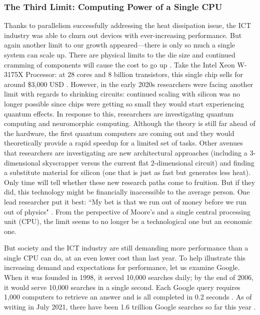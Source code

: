 \documentclass{article}
\begin{document}
\subsubsection{The Third Limit: Computing Power of a Single CPU}
Thanks to parallelism successfully addressing the heat dissipation issue, the ICT industry was able to churn out devices with ever-increasing performance. But again another limit to our growth appeared—there is only so much a single system can scale up. There are physical limits to the die size and continued cramming of components will cause the cost to go up \cite{krzyzanowski2020distributedsystems}. Take the Intel Xeon W-3175X Processor: at 28 cores and 8 billion transistors, this single chip sells for around \$3,000 USD \cite{intel2021processor}. However, in the early 2020s researchers were facing another limit with regards to shrinking circuits: continued scaling with silicon was no longer possible since chips were getting so small they would start experiencing quantum effects. In response to this, researchers are investigating quantum computing and neuromorphic computing. Although the theory is still far ahead of the hardware, the first quantum computers are coming out \cite{newscientist2020IBMquantum, chen2021integrated} and they would theoretically provide a rapid speedup for a limited set of tasks. Other avenues that researchers are investigating are new architectural approaches (including a 3-dimensional skyscrapper versus the current flat 2-dimensional circuit) and finding a substitute material for silicon (one that is just as fast but generates less heat). Only time will tell whether these new research paths come to fruition. But if they did, this technology might be financially inaccessible to the average person. One lead researcher put it best: ``My bet is that we run out of money before we run out of physics" \cite{waldrop2016chips}. From the perspective of Moore's and a single central processing unit (CPU), the limit seems to no longer be a technological one but an economic one.

But society and the ICT industry are still demanding more performance than a single CPU can do, at an even lower cost than last year. To help illustrate this increasing demand and expectations for performance, let us examine Google. When it was founded in 1998, it served 10,000 searches daily; by the end of 2006, it would serve 10,000 searches in a single second. Each Google query requires 1,000 computers to retrieve an answer and is all completed in 0.2 seconds \cite{internetlivestats2021googelsearch}. As of writing in July 2021, there have been 1.6 trillion Google searches so far this year \cite{worldometers2021}.
\end{document}
